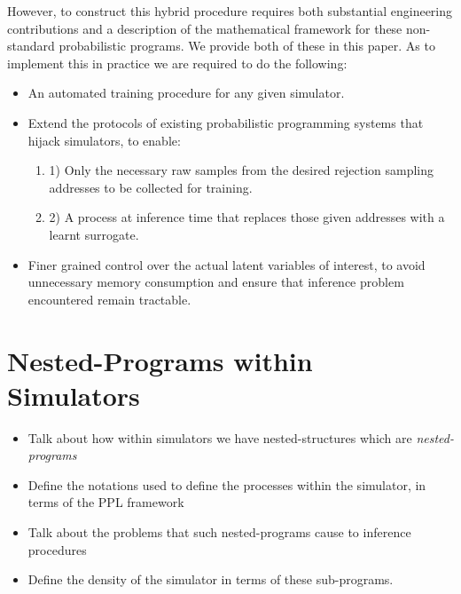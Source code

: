 \documentclass{article}
\begin{document}
However, to construct this hybrid procedure requires both substantial engineering contributions 
and a description of the mathematical framework for these non-standard probabilistic programs. 
We provide both of these in this paper. As to implement this in practice we are required to do the following:
 \begin{itemize}
    \item An automated training procedure for any given simulator.
    \item Extend the protocols of existing probabilistic programming systems that hijack simulators, to enable:
    \begin{enumerate} \item 1) Only the necessary raw samples from the desired rejection sampling addresses to be collected for training.
                       \item 2) A process at inference time that replaces those given addresses with a learnt surrogate.
    \end{enumerate}
    \item Finer grained control over the actual latent variables of interest, to avoid unnecessary memory consumption and ensure that inference problem encountered remain tractable.
  \end{itemize}


\section{Nested-Programs within Simulators}

\begin{itemize}
  \item Talk about how within simulators we have nested-structures which are \emph{nested-programs}
  \item Define the notations used to define the processes within the simulator, in terms of the PPL framework
  \item Talk about the problems that such nested-programs cause to inference procedures
  \item Define the density of the simulator in terms of these sub-programs. 
\end{itemize}
\end{document}
